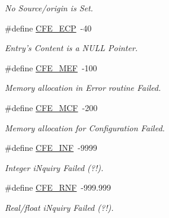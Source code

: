 \begin{CompactItemize}
\begin{CompactList}\small\item\em No Source/origin is Set. \item\end{CompactList}\item 
\hypertarget{group__errors_gaa38e8556d85b1bb41037b3bd022bc28}{
\#define \hyperlink{group__errors_gaa38e8556d85b1bb41037b3bd022bc28}{CFE\_\-ECP}~-40}
\label{group__errors_gaa38e8556d85b1bb41037b3bd022bc28}

\begin{CompactList}\small\item\em Entry's Content is a NULL Pointer. \item\end{CompactList}\item 
\hypertarget{group__errors_g46fb52baac2d4b91c5169a2918caff5d}{
\#define \hyperlink{group__errors_g46fb52baac2d4b91c5169a2918caff5d}{CFE\_\-MEF}~-100}
\label{group__errors_g46fb52baac2d4b91c5169a2918caff5d}

\begin{CompactList}\small\item\em Memory allocation in Error routine Failed. \item\end{CompactList}\item 
\hypertarget{group__errors_g127dc37aea6ba5ef8d9dfe5cb9c629eb}{
\#define \hyperlink{group__errors_g127dc37aea6ba5ef8d9dfe5cb9c629eb}{CFE\_\-MCF}~-200}
\label{group__errors_g127dc37aea6ba5ef8d9dfe5cb9c629eb}

\begin{CompactList}\small\item\em Memory allocation for Configuration Failed. \item\end{CompactList}\item 
\hypertarget{group__errors_gc6a0861a0e376a94e540d7ba95ebe9cf}{
\#define \hyperlink{group__errors_gc6a0861a0e376a94e540d7ba95ebe9cf}{CFE\_\-INF}~-9999}
\label{group__errors_gc6a0861a0e376a94e540d7ba95ebe9cf}

\begin{CompactList}\small\item\em Integer iNquiry Failed (?!). \item\end{CompactList}\item 
\hypertarget{group__errors_g0415e4b197dc2908a58c026c4e621578}{
\#define \hyperlink{group__errors_g0415e4b197dc2908a58c026c4e621578}{CFE\_\-RNF}~-999.999}
\label{group__errors_g0415e4b197dc2908a58c026c4e621578}

\begin{CompactList}\small\item\em Real/float iNquiry Failed (?!). \item\end{CompactList}\end{CompactItemize}
